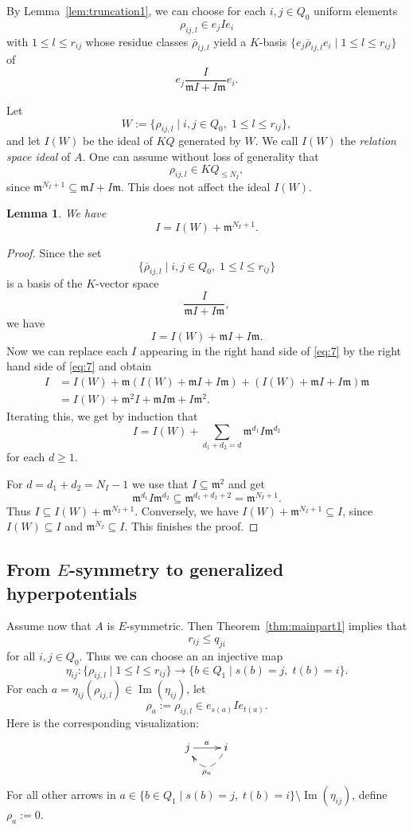 \documentclass[12pt,reqno]{amsart}
\newtheorem{Lem}[Thm]{Lemma}
\theoremstyle{definition}
\newcommand{\df}{\colon}
\newcommand{\m}{\mathfrak{m}}
\newcommand{\Ima}{\operatorname{Im}}
\begin{document}
By Lemma~\ref{lem:truncation1}, we can choose for each $i,j \in Q_0$ uniform elements
$$
\rho_{ij,l} \in e_jIe_i 
$$ with $1 \le l \le r_{ij}$ whose 
residue classes $\overline{\rho}_{ij,l}$ %
yield a $K$-basis 
$\{ e_j\overline{\rho}_{ij,l}e_i \mid 1 \le l \le r_{ij} \}$
of
$$
e_j \frac{I}{\m I + I \m} e_i.
$$

Let 
$$
W := \{ \rho_{ij,l} \mid i,j \in Q_0,\; 1 \le l \le r_{ij} \},
$$
and let $I(W)$ be the ideal of $KQ$ generated by $W$.
We call $I(W)$ the \emph{relation space ideal} of $A$.
One can assume without loss of generality that
$$
\rho_{ij,l} \in KQ_{\le N_I},
$$
since $\m^{N_I+1} \subseteq \m I + I \m$.
This does not affect the ideal $I(W)$.

\begin{Lem}\label{lem:truncation2}
We have
$$
I = I(W) + \m^{N_I+1}.
$$
\end{Lem}

\begin{proof} 
Since the set 
$$
\{ \overline{\rho}_{ij,l} \mid i,j \in Q_0,\; 1 \le l \le r_{ij} \}
$$
is a basis of the $K$-vector space
$$
\frac{I}{\m I + I \m},
$$
we have
\begin{equation}\label{eq:7}
I = I(W) + \m I + I \m.
\end{equation}
Now we can replace each $I$ appearing in the right hand side of \eqref{eq:7}
by the right hand side of \eqref{eq:7}
and obtain
\begin{align*}
I &= I(W) + \m(I(W) + \m I + I \m) + (I(W) + \m I + I \m)\m
\\
&= I(W) + \m^2 I + \m I \m + I \m^2. 
\end{align*}
Iterating this, we get by induction that
$$
I = I(W) +\sum_{d_1+d_2 = d} \m^{d_1} I \m^{d_2} 
$$
for each $d \ge 1$.

For $d = d_1+d_2 = N_I-1$ we use that $I \subseteq \m^2$ and get
$$
\m^{d_1} I \m^{d_2} \subseteq \m^{d_1+d_2+2} = \m^{N_I+1}.
$$
Thus $I \subseteq I(W) + \m^{N_I+1}$.
Conversely, we have
$I(W) + \m^{N_I+1} \subseteq I$, since $I(W) \subseteq I$ and
$\m^{N_I} \subseteq I$.
This finishes the proof.
\end{proof}




\subsection{From $E$-symmetry to generalized hyperpotentials}
\label{subsec:h2}
Assume now that $A$ is $E$-symmetric.
Then
Theorem~\ref{thm:mainpart1} implies that
$$
r_{ij} \le q_{ji}
$$
for all $i,j \in Q_0$.
Thus we can choose an
an injective map
$$
\eta_{ij}\df \{ \rho_{ij,l} \mid 1 \le l \le r_{ij} \}
\to \{ b \in Q_1 \mid s(b) = j,\; t(b) = i \}.
$$
For each $a = \eta_{ij}(\rho_{ij,l}) \in \Ima(\eta_{ij})$, let
$$
\rho_a := \rho_{ij,l} \in e_{s(a)} I e_{t(a)}.
$$
Here is the corresponding visualization:
$$
\xymatrix{
j \ar[r]^a 
& i \ar@{-->}@/^4ex/[l]^{\rho_a}
}
$$
For all other arrows in $a \in \{ b \in Q_1 \mid s(b) = j,\; t(b) = i \}
\setminus \Ima(\eta_{ij})$, define $\rho_a := 0$.
\end{document}
